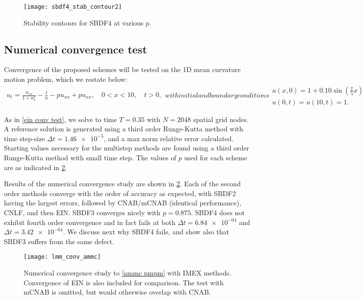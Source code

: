 \begin{figure}[htb!]
        \centering
\texttt{[image: sbdf4\_stab\_contour2]}
\caption{Stability contours for SBDF4 at various $p$.}
\label{sbdf4 contours}
\end{figure}

\subsection{Numerical convergence test}
Convergence of the proposed schemes will be tested on the 1D mean curvature motion problem, which we restate below:
\begin{subequations}
\begin{align}
        u_t = \frac{u_{xx}}{1 + u_x^2} - \frac{1}{u} - pu_{xx} + pu_{xx},
\quad 0< x< 10,\quad t>0,
\end{align}
with initial and boundary conditions
\begin{gather}
        u(x,0) = 1 + 0.10\sin\left(\frac{\pi}{5}x \right) 
\\
u(0,t) = u(10,t) = 1.
\end{gather}
\label{ammc pmpm}
\end{subequations}

As in \cref{ein conv test}, we solve to time $T=0.35$ with $N=2048$ spatial grid nodes. A reference solution is generated using a third order Runge-Kutta method with time step-size $\Delta t = \num{1.46e-5}$, and a max norm relative error calculated. Starting values necessary for the multistep methods are found using a third order Runge-Kutta method with small time step. The values of $p$ used for each scheme are as indicated in \cref{lmm conv test}.

Results of the numerical convergence study are shown in \cref{lmm conv test}. Each of the second order methods converge with the order of accuracy as expected, with SBDF2 having the largest errors, followed by CNAB/mCNAB (identical performance), CNLF, and then EIN. SBDF3 converges nicely with $p=0.875$. SBDF4 does not exhibit fourth order convergence and in fact fails at both $\Delta t =\num{6.84e-04}$ and $\Delta t=\num{3.42e-04}$. We discuss next why SBDF4 fails, and show also that SBDF3 suffers from the same defect.

\begin{figure}
        \centering
\texttt{[image: lmm\_conv\_ammc]}
\caption[Numerical convergence study with IMEX LMMs]{Numerical convergence study to \cref{ammc pmpm} with IMEX methods. Convergence of EIN is also included for comparison. The test with mCNAB is omitted, but would otherwise overlap with CNAB.}
\label{lmm conv test}
\end{figure}


